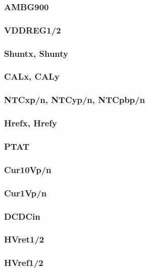 \documentclass[11pt]{article}   			%
\begin{document}
\subsubsection{AMBG900}

\subsubsection{VDDREG1/2}

\subsubsection{Shuntx, Shunty}

\subsubsection{CALx, CALy}

\subsubsection{NTCxp/n, NTCyp/n, NTCpbp/n}

\subsubsection{Hrefx, Hrefy}

\subsubsection{PTAT}

\subsubsection{Cur10Vp/n}

\subsubsection{Cur1Vp/n}

\subsubsection{DCDCin}

\subsubsection{HVret1/2}

\subsubsection{HVref1/2}
\end{document}
